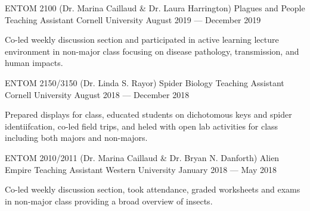 

\begin{cventries}

  \cventry
    {ENTOM 2100 (Dr. Marina Caillaud \& Dr. Laura Harrington)} %
    {Plagues and People Teaching Assistant} %
    {Cornell University} %
    {August 2019 — December 2019} %
    {
      \begin{cvitems} %
        \item {Co-led weekly discussion section and participated in active learning lecture environment in non-major class focusing on disease pathology, transmission, and human impacts.}
      \end{cvitems}
    }

  \cventry
    {ENTOM 2150/3150 (Dr. Linda S. Rayor)} %
    {Spider Biology Teaching Assistant} %
    {Cornell University} %
    {August 2018 — December 2018} %
    {
      \begin{cvitems} %
        \item {Prepared displays for class, educated students on dichotomous keys and spider identiifcation, co-led field trips, and heled with open lab activities for class including both majors and non-majors.}
      \end{cvitems}
    }

  \cventry
    {ENTOM 2010/2011 (Dr. Marina Caillaud \& Dr. Bryan N. Danforth)} %
    {Alien Empire Teaching Assistant} %
    {Western University} %
    {January 2018 — May 2018} %
    {
      \begin{cvitems} %
        \item {Co-led weekly discussion section, took attendance, graded worksheets and exams in non-major class providing a broad overview of insects.}
      \end{cvitems}
    }


\end{cventries}

